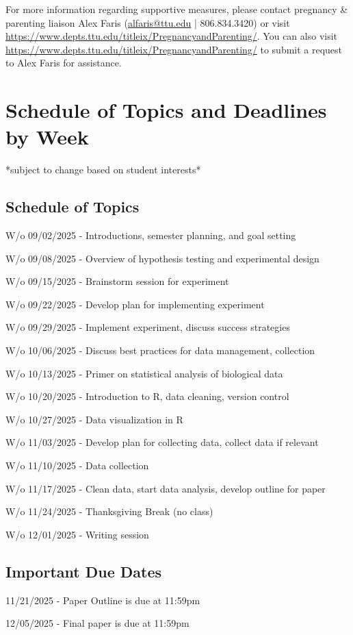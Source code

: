 \documentclass[12pt, notitlepage]{article}   	%
\begin{document}
{For more information regarding supportive measures, please contact pregnancy \& parenting liaison Alex Faris (\href{mailto:alfaris@ttu.edu}{alfaris@ttu.edu} | 806.834.3420) or visit \newline \href{https://www.depts.ttu.edu/titleix/PregnancyandParenting/}{https://www.depts.ttu.edu/titleix/PregnancyandParenting/}. You can also visit \newline \href{https://www.depts.ttu.edu/titleix/PregnancyandParenting/}{https://www.depts.ttu.edu/titleix/PregnancyandParenting/} to submit a request to Alex Faris for assistance.


\newpage
\section*{Schedule of Topics and Deadlines by Week}
*subject to change based on student interests* \par

\subsection{Schedule of Topics}
W/o 09/02/2025 - Introductions, semester planning, and goal setting \par
W/o 09/08/2025 - Overview of hypothesis testing and experimental design \par
W/o 09/15/2025 - Brainstorm session for experiment \par
W/o 09/22/2025 - Develop plan for implementing experiment \par
W/o 09/29/2025 - Implement experiment, discuss success strategies \par
W/o 10/06/2025 - Discuss best practices for data management, collection \par
W/o 10/13/2025 - Primer on statistical analysis of biological data \par
W/o 10/20/2025 - Introduction to R, data cleaning, version control \par
W/o 10/27/2025 - Data visualization in R \par
W/o 11/03/2025 - Develop plan for collecting data, collect data if relevant \par
W/o 11/10/2025 - Data collection \par
W/o 11/17/2025 - Clean data, start data analysis, develop outline for paper \par
W/o 11/24/2025 - Thanksgiving Break (no class) \par
W/o 12/01/2025 - Writing session \par

\subsection{Important Due Dates}
11/21/2025 - Paper Outline is due at 11:59pm \par
12/05/2025 - Final paper is due at 11:59pm \par

} %
\end{document}
